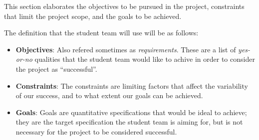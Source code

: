 This section elaborates the objectives to be pursued in the project, 
constraints that limit the project scope, 
and the goals to be achieved.

The definition that the student team will use will be as follows:

\begin{itemize}
    \item \textbf{Objectives}: Also refered sometimes as \textit{requirements}. 
    These are a list of \textit{yes-or-no} qualities that the student team 
    would like to achive in order to consider the project as ``successful''.
    
    \item \textbf{Constraints}: The constraints are limiting factors that
    affect the variability of our success, and to what extent our goals
    can be achieved.

    \item \textbf{Goals}: Goals are quantitative specifications that would 
    be ideal to achieve; they are the target specification the student team
    is aiming for, but is not necessary for the project to be considered
    successful.

\end{itemize}